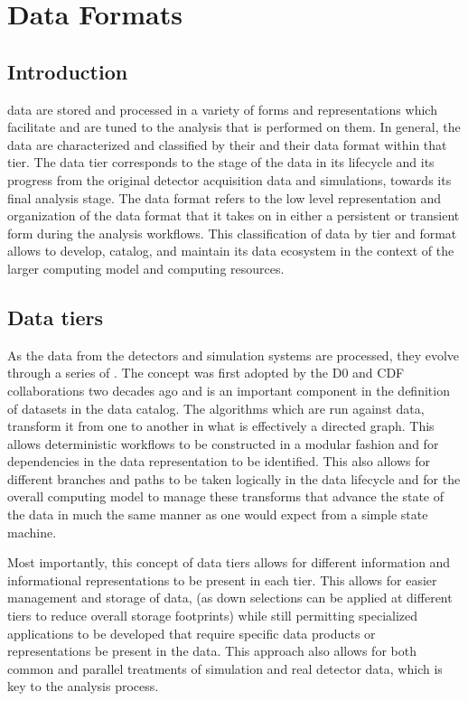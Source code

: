 \documentclass[../main-v1.tex]{subfiles}
\begin{document}
\chapter{Data Formats}
\label{ch:format}



\section{Introduction } 

 data are stored and processed in a variety of forms and representations which facilitate and are tuned to the analysis that is performed on them.
In general, %
the data are characterized and classified by their  and their data format within that tier.  The data tier corresponds to the stage of the data in its lifecycle and its progress from the original detector acquisition data and simulations, towards its final analysis stage.  The data format refers to the low level representation and organization of the data format that it takes on in either a persistent or transient form during the analysis workflows.  This classification of data by tier and format allows  to develop, catalog, and maintain its data ecosystem in the context of the larger computing model and computing resources.


\section{Data tiers }

As the data from the  detectors and simulation systems are processed, they evolve through a series of .  The  concept was first adopted by the D0 and CDF collaborations two decades ago and is an important component in the definition of datasets in the data catalog.
The algorithms which are run against data, transform it from one  to another in what is effectively a directed graph.  This allows deterministic workflows to be constructed in a modular fashion and for dependencies in the data representation to be identified.  This also allows for different branches and paths to be taken logically in the data lifecycle and for the overall computing model to manage these transforms that advance the state of the data in much the same manner as one would expect from a simple state machine.

Most importantly, this concept of data tiers allows for different information and informational representations to be present in each tier.  This allows for easier management and storage of data, (as down selections can be applied at different tiers to reduce overall storage footprints) while still permitting specialized applications to be developed that require specific data products or representations be present in the data. %
This approach also allows for both common and parallel treatments of simulation and real detector data, which is key to the analysis process. 
\end{document}
